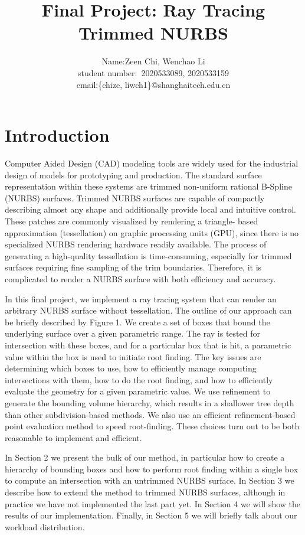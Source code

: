 \documentclass[acmtog]{acmart}
\title{Final Project: {Ray Tracing Trimmed NURBS}}
\author{Name:\quad Zeen Chi, Wenchao Li  \\ student number:\ 2020533089, 2020533159
\\email:\quad \{chize, liwch1\}@shanghaitech.edu.cn}
\begin{document}
\maketitle

\vspace*{2 ex}

\section{Introduction}
\hspace*{8pt}
Computer Aided Design (CAD) modeling tools are widely used for the industrial design of models for prototyping and production. The standard surface representation within these systems are trimmed non-uniform rational B-Spline (NURBS) surfaces. Trimmed NURBS surfaces are capable of compactly describing almost any shape and additionally provide local and intuitive control. These patches are commonly visualized by rendering a triangle- based approximation (tessellation) on graphic processing units (GPU), since there is no specialized NURBS rendering hardware readily available. The process of generating a high-quality tessellation is time-consuming, especially for trimmed surfaces requiring fine sampling of the trim boundaries. Therefore, it is complicated to render a NURBS surface with both efficiency and accuracy.

In this final project, we implement a ray tracing system that can render an arbitrary NURBS surface without tessellation. The outline of our approach can be briefly described by Figure 1. We create a set of boxes that bound the underlying surface over a given parametric range. The ray is tested for intersection with these boxes, and for a particular box that is hit, a parametric value within the box is used to initiate root finding. The key issues are determining which boxes to use, how to efficiently manage computing intersections with them, how to do the root finding, and how to efficiently evaluate the geometry for a given parametric value.
We use refinement to generate the bounding volume hierarchy, which results in a shallower tree depth than other subdivision-based methods. We also use an efficient refinement-based point evaluation method to speed root-finding. These choices turn out to be both reasonable to implement and efficient.

In Section 2 we present the bulk of our method, in particular how to create a hierarchy of bounding boxes and how to perform root finding within a single box to compute an intersection with an untrimmed NURBS surface. In Section 3 we describe how to extend the method to trimmed NURBS surfaces, although in practice we have not implemented the last part yet. In Section 4 we will show the results of our implementation. Finally, in Section 5 we will briefly talk about our workload distribution.
\end{document}
